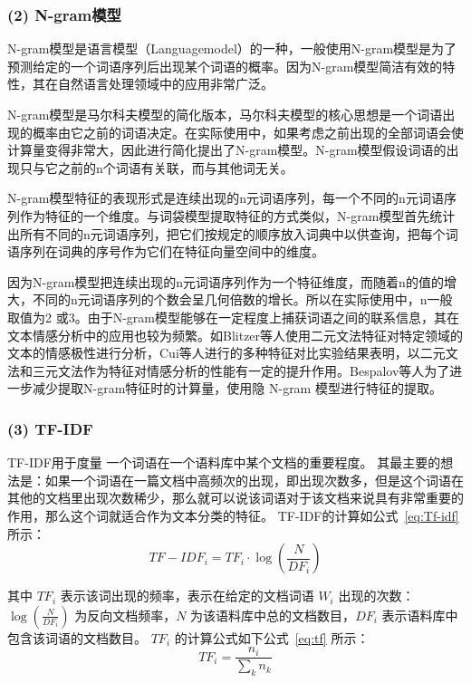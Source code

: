 \documentclass[cs4size,a4paper]{ctexart}
\numberwithin{equation}{section}
\numberwithin{table}{section}
\numberwithin{figure}{section}
\begin{document}
\subsubsection*{(2) N-gram模型}

N-gram模型是语言模型（Languagemodel）的一种，一般使用N-gram模型是为了预测给定的一个词语序列后出现某个词语的概率。因为N-gram模型简洁有效的特性，其在自然语言处理领域中的应用非常广泛。

N-gram模型是马尔科夫模型的简化版本，马尔科夫模型的核心思想是一个词语出现的概率由它之前的词语决定。在实际使用中，如果考虑之前出现的全部词语会使计算量变得非常大，因此进行简化提出了N-gram模型。N-gram模型假设词语的出现只与它之前的n个词语有关联，而与其他词无关。

N-gram模型特征的表现形式是连续出现的n元词语序列，每一个不同的n元词语序列作为特征的一个维度。与词袋模型提取特征的方式类似，N-gram模型首先统计出所有不同的n元词语序列，把它们按规定的顺序放入词典中以供查询，把每个词语序列在词典的序号作为它们在特征向量空间中的维度。

因为N-gram模型把连续出现的n元词语序列作为一个特征维度，而随着n的值的增大，不同的n元词语序列的个数会呈几何倍数的增长。所以在实际使用中，n一般取值为2 或3。由于N-gram模型能够在一定程度上捕获词语之间的联系信息，其在文本情感分析中的应用也较为频繁。如Blitzer等人使用二元文法特征对特定领域的文本的情感极性进行分析，Cui等人进行的多种特征对比实验结果表明，以二元文法和三元文法作为特征对情感分析的性能有一定的提升作用。Bespalov等人为了进一步减少提取N-gram特征时的计算量，使用隐 N-gram 模型进行特征的提取。

\subsubsection*{(3) TF-IDF}

TF-IDF用于度量
一个词语在一个语料库中某个文档的重要程度。
其最主要的想法是：如果一个词语在一篇文档中高频次的出现，即出现次数多，但是这个词语在其他的文档里出现次数稀少，那么就可以说该词语对于该文档来说具有非常重要的作用，那么这个词就适合作为文本分类的特征。
TF-IDF的计算如公式~\ref{eq:Tf-idf} 所示：
\begin{equation}\label{eq:Tf-idf}
{TF-IDF}_i = {TF}_i \cdot \log(\frac{N}{{DF}_i})
\end{equation}

其中 ${TF}_i$ 表示该词出现的频率，表示在给定的文档词语 $W_i$ 出现的次数：$\log(\frac{N}{DF_i})$ 为反向文档频率，$N$ 为该语料库中总的文档数目，$DF_i$ 表示语料库中包含该词语的文档数目。 $TF_i$ 的计算公式如下公式~\ref{eq:tf} 所示：
\begin{equation}\label{eq:tf}
TF_i = \frac{n_i}{\sum_{k}n_k}
\end{equation}
\end{document}
